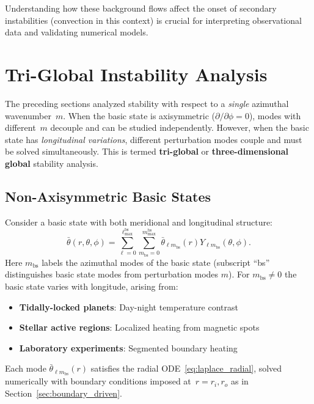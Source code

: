 \documentclass[11pt]{article}
\numberwithin{equation}{section}
\begin{document}
Understanding how these background flows affect the onset of secondary instabilities (convection in this context) is crucial for interpreting observational data and validating numerical models.

\section{Tri-Global Instability Analysis}
\label{sec:triglobal}

The preceding sections analyzed stability with respect to a \emph{single} azimuthal wavenumber~$m$. When the basic state is axisymmetric ($\partial/\partial\phi=0$), modes with different~$m$ decouple and can be studied independently. However, when the basic state has \emph{longitudinal variations}, different perturbation modes couple and must be solved simultaneously. This is termed \textbf{tri-global} or \textbf{three-dimensional global} stability analysis.

\subsection{Non-Axisymmetric Basic States}

Consider a basic state with both meridional and longitudinal structure:
\begin{equation}
  \bar{\theta}(r,\theta,\phi) = \sum_{\ell=0}^{\ell_{\max}^{\text{bs}}} \sum_{m_{\text{bs}}=0}^{m_{\max}^{\text{bs}}} \bar{\theta}_{\ell m_{\text{bs}}}(r) Y_{\ell m_{\text{bs}}}(\theta,\phi).
  \label{eq:theta_3d}
\end{equation}
Here $m_{\text{bs}}$ labels the azimuthal modes of the basic state (subscript ``bs'' distinguishes basic state modes from perturbation modes $m$). For $m_{\text{bs}}\neq0$ the basic state varies with longitude, arising from:
\begin{itemize}
  \item \textbf{Tidally-locked planets}: Day-night temperature contrast
  \item \textbf{Stellar active regions}: Localized heating from magnetic spots
  \item \textbf{Laboratory experiments}: Segmented boundary heating
\end{itemize}

Each mode $\bar{\theta}_{\ell m_{\text{bs}}}(r)$ satisfies the radial ODE~\eqref{eq:laplace_radial}, solved numerically with boundary conditions imposed at~$r=r_i,r_o$ as in Section~\ref{sec:boundary_driven}.
\end{document}
